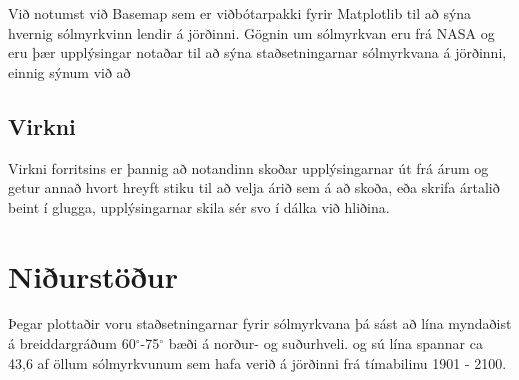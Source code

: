 \documentclass[12pt, git, final]{rureport}
\begin{document}
Við notumst við Basemap\cite{basemap} sem er viðbótarpakki fyrir Matplotlib til að sýna hvernig sólmyrkvinn lendir á jörðinni. Gögnin um sólmyrkvan eru frá NASA og eru þær upplýsingar notaðar til að sýna staðsetningarnar sólmyrkvana á jörðinni, einnig sýnum við að 

\subsection{Virkni}
Virkni forritsins er þannig að notandinn skoðar upplýsingarnar út frá árum og getur annað hvort hreyft stiku til að velja árið sem á að skoða, eða skrifa ártalið beint í glugga, upplýsingarnar skila sér svo í dálka við hliðina.




\section{Niðurstöður}\label{nidurstodur}
Þegar plottaðir voru staðsetningarnar fyrir sólmyrkvana þá sást að lína myndaðist á breiddargráðum 60$^{\circ}$-75$^{\circ}$ bæði á norður- og suðurhveli. og sú lína spannar ca 43,6 af öllum sólmyrkvunum sem hafa verið á jörðinni frá tímabilinu 1901 - 2100.



\pagebreak


\clearpage
\printbibliography
\end{document}
